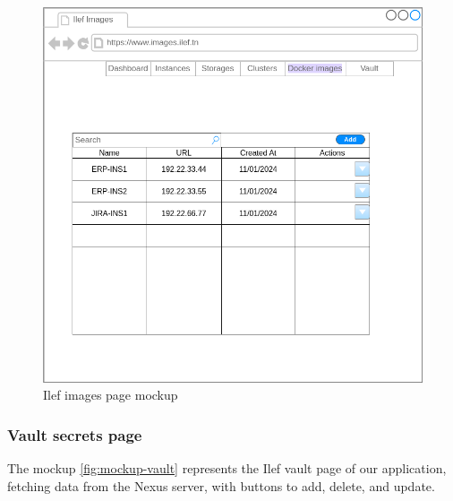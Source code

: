 \begin{figure}[h]
  \center
  \includegraphics[width=13cm]{./chapters/preliminary_study/mockup-images.png}
  \caption{Ilef images page mockup}
  \label{fig:mockup-images}
\end{figure}

\vspace*{2cm}

\subsubsection{Vault secrets page}

The mockup \hyperref[fig:mockup-vault]{\ref{fig:mockup-vault}} represents the Ilef vault page of our application, fetching data from the Nexus server, with buttons to add, delete, and update.


